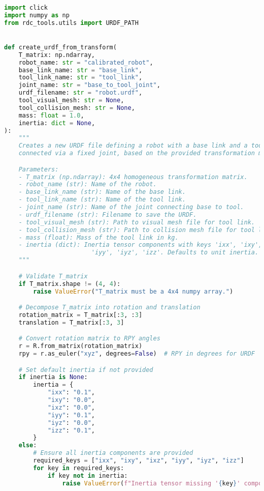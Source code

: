 \begin{lstlisting}[language=python, caption=\raggedright{calibration/sensor\_calibration.py}, frame=single]
import click
import numpy as np
from rdc_tools.utils import URDF_PATH


def create_urdf_from_transform(
    T_matrix: np.ndarray,
    robot_name: str = "calibrated_robot",
    base_link_name: str = "base_link",
    tool_link_name: str = "tool_link",
    joint_name: str = "base_to_tool_joint",
    urdf_filename: str = "robot.urdf",
    tool_visual_mesh: str = None,
    tool_collision_mesh: str = None,
    mass: float = 1.0,
    inertia: dict = None,
):
    """
    Creates a new URDF file defining a robot with a base link and a tool link
    connected via a fixed joint, based on the provided transformation matrix.

    Parameters:
    - T_matrix (np.ndarray): 4x4 homogeneous transformation matrix.
    - robot_name (str): Name of the robot.
    - base_link_name (str): Name of the base link.
    - tool_link_name (str): Name of the tool link.
    - joint_name (str): Name of the joint connecting base to tool.
    - urdf_filename (str): Filename to save the URDF.
    - tool_visual_mesh (str): Path to visual mesh file for tool link.
    - tool_collision_mesh (str): Path to collision mesh file for tool link.
    - mass (float): Mass of the tool link in kg.
    - inertia (dict): Inertia tensor components with keys 'ixx', 'ixy', 'ixz',
                        'iyy', 'iyz', 'izz'. Defaults to unit inertia.
    """

    # Validate T_matrix
    if T_matrix.shape != (4, 4):
        raise ValueError("T_matrix must be a 4x4 numpy array.")

    # Decompose T_matrix into rotation and translation
    rotation_matrix = T_matrix[:3, :3]
    translation = T_matrix[:3, 3]

    # Convert rotation matrix to RPY angles
    r = R.from_matrix(rotation_matrix)
    rpy = r.as_euler("xyz", degrees=False)  # RPY in degrees for URDF

    # Set default inertia if not provided
    if inertia is None:
        inertia = {
            "ixx": "0.1",
            "ixy": "0.0",
            "ixz": "0.0",
            "iyy": "0.1",
            "iyz": "0.0",
            "izz": "0.1",
        }
    else:
        # Ensure all inertia components are provided
        required_keys = ["ixx", "ixy", "ixz", "iyy", "iyz", "izz"]
        for key in required_keys:
            if key not in inertia:
                raise ValueError(f"Inertia tensor missing '{key}' component.")


\end{lstlisting}
